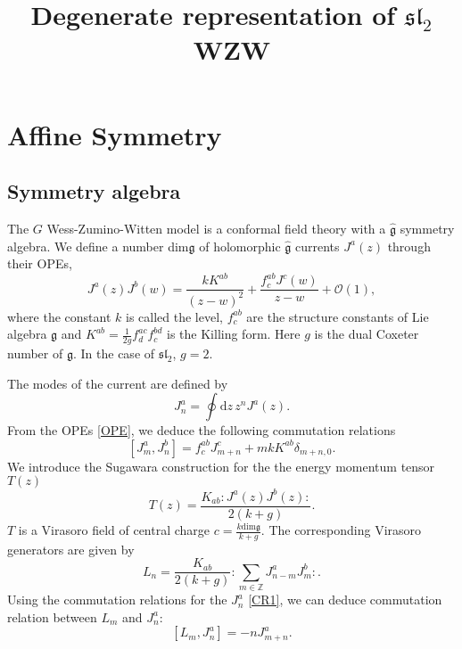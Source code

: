 \documentclass[10pt,a4paper]{article}
\numberwithin{equation}{section}
\begin{document}
\title{Degenerate representation of $\mathfrak{sl}_{2}$ WZW}
\maketitle

\section{Affine Symmetry}
\subsection{Symmetry algebra}
The $G$ Wess-Zumino-Witten model is a conformal field theory with a $\hat{\mathfrak{g}}$ symmetry algebra. We define a number dim$\mathfrak{g}$ of 
holomorphic $\hat{\mathfrak{g}}$ currents $J^{a}(z)$ through their OPEs,
\begin{equation}
    \boxed{
        J^{a}(z)J^{b}(w) = \frac{kK^{ab}}{(z-w)^{2}} + \frac{f^{ab}_{c} J^{c}(w)}{z-w} + \mathcal{O}(1), \label{OPE}
        }
\end{equation}
where the constant $k$ is called the level, $f^{ab}_{c}$ are the structure constants of Lie algebra $\mathfrak{g}$ and 
$K^{ab} = \frac{1}{2g} f^{ac}_{d}f^{bd}_{c}$ is the Killing form. Here $g$ is the dual Coxeter number of $\mathfrak{g}$. In the case of 
$\mathfrak{sl}_{2}$, $g = 2$.\\
\par The modes of the current are defined by 
\begin{equation}
    J^{a}_{n} = \oint \mathrm{d}z \, z^{n} J^{a}(z).
\end{equation}
From the OPEs \eqref{OPE}, we deduce the following commutation relations
\begin{equation}
    \left[ J^{a}_{m}, J^{b}_{n} \right] = f^{ab}_{c} J^{c}_{m+n} + m k K^{ab} \delta_{m+n,0}. \label{CR1}
\end{equation}
We introduce the Sugawara construction for the the energy momentum tensor $T(z)$
\begin{equation}
    \boxed{T(z) = \frac{K_{ab} : J^{a}(z) J^{b}(z) : }{2(k+g)}.} \label{EM}
\end{equation}
$T$ is a Virasoro field of central charge $c = \frac{k \mathrm{dim} \mathfrak{g}}{k+g}$. The corresponding Virasoro generators are given by
\begin{equation}
    L_{n} = \frac{K_{ab}}{2(k+g)} : \sum_{m \in \mathbb{Z} } J^{a}_{n-m} J^{b}_{m} :.
\end{equation}
Using the commutation relations for the $J^{a}_{n}$ \eqref{CR1}, we can deduce commutation relation between $L_{m}$ and $J^{a}_{n}$:
\begin{equation}
    \left[ L_{m}, J^{a}_{n} \right] = -n J^{a}_{m+n}. \label{CR2}
\end{equation}
\end{document}
